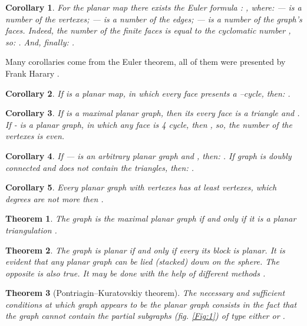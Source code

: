 \documentclass{amsart}
\newtheorem{theorem}{Theorem}
\theoremstyle{plain}
\newtheorem{corollary}{Corollary}
\numberwithin{equation}{section}
\begin{document}
\begin {corollary}
For the planar map there exists the Euler formula \cite{Euler}:  , where:  --- is a number of the vertexes;  --- is a number of the edges;  --- is a number of the graph's faces. Indeed, the number of the finite faces is equal to the cyclomatic number , so: . 
And, finally: . 
\end{corollary}

Many corollaries come from the Euler theorem, all of them were presented by Frank Harary \cite {Harary}.

\begin {corollary}
If  is a planar  map, in which every face presents a --cycle, then: .
\end {corollary}

\begin {corollary}
If  is a maximal planar  graph, then its every face is a triangle and . If  - is a planar graph, in which any face is 4 cycle, then , so, the number of the vertexes is even.
\end {corollary}

\begin {corollary}
If  --- is an arbitrary planar  graph and , then: . If graph  is doubly connected and does not contain the triangles, then: .
\end {corollary}

\begin {corollary}
Every planar graph  with  vertexes has at least  vertexes, which degrees are not more then .
\end {corollary}

\begin {theorem}
The graph is the maximal planar graph if and only if it is a planar triangulation \cite {Harary}.
\end {theorem}

\begin {theorem}
The graph is planar if and only if every its block is planar. It is evident that any planar graph can be lied (stacked) down on the sphere. The opposite is also true. It may be done with the help of different methods \cite {Harary}.
\end {theorem}

\begin {theorem}[Pontriagin--Kuratovskiy theorem] 
The necessary and sufficient conditions at which graph  appears to be the planar graph consists in the fact that the graph cannot contain the partial subgraphs (fig. \ref {Fig:1}) of type either  or  \cite {Berge}.
\end {theorem}
\end{document}
